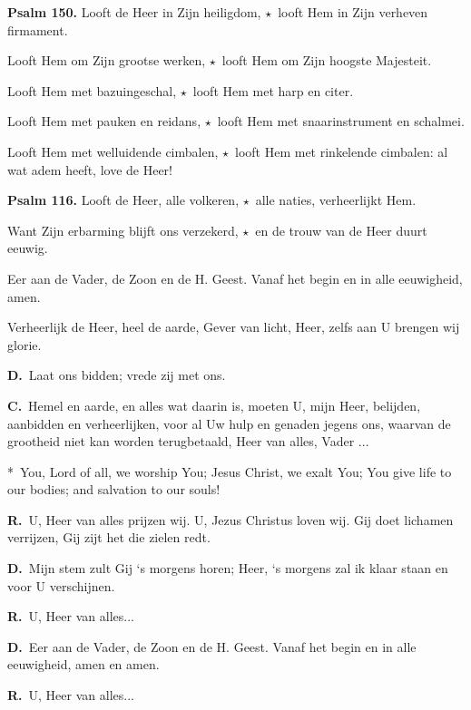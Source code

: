 \documentclass[12pt,twoside,a5paper]{article}
\newlength{\origparskip}
\newenvironment{halfparskip}{
  \setlength{\parskip}{0.5\origparskip}
}{
  \setlength{\parskip}{\origparskip}
}
\newcommand{\cc}{{\color{BrickRed} \textbf{C.}}}
\newcommand{\dd}{{\color{BrickRed} \textbf{D.}}}
\newcommand{\rr}{{\color{BrickRed} \textbf{R.}}}
\newcommand{\sep}{{\color{BrickRed} \textbf{$\star$}}}
\newcommand{\liturgicaloption}[1]{{\color{BrickRed}\textbf{#1}}}
\newcommand{\psalm}[1]{\liturgicaloption{Psalm #1.}}
\newenvironment{doublecols}{%
  \begin{paracol}{2}%
    \setlength{\columnsep}{1.5em}%
}{%
  \end{paracol}%
}
\newcommand{\englishl}{\switchcolumn[0]*\selectlanguage{english}}%
\newcommand{\dutchc}[1]{\switchcolumn[#1]\selectlanguage{dutch}}%
\begin{document}
\begin{halfparskip}
  \psalm{150} Looft de Heer in Zijn heiligdom, \sep\ looft Hem in Zijn verheven firmament.

  Looft Hem om Zijn grootse werken, \sep\ looft Hem om Zijn hoogste Majesteit.

  Looft Hem met bazuingeschal, \sep\ looft Hem met harp en citer.

  Looft Hem met pauken en reidans, \sep\ looft Hem met snaarinstrument en schalmei.

  Looft Hem met welluidende cimbalen, \sep\ looft Hem met rinkelende cimbalen: al wat adem heeft, love de Heer!
\end{halfparskip}

\begin{halfparskip}
  \psalm{116} Looft de Heer, alle volkeren, \sep\ alle naties, verheerlijkt Hem.

  Want Zijn erbarming blijft ons verzekerd, \sep\ en de trouw van de Heer duurt eeuwig.

  Eer aan de Vader, de Zoon en de H. Geest. Vanaf het begin en in alle eeuwigheid, amen.

  Verheerlijk de Heer, heel de aarde, Gever van licht, Heer, zelfs aan U brengen wij glorie.
\end{halfparskip}

\dd\ Laat ons bidden; vrede zij met ons.

\cc\ Hemel en aarde, en alles wat daarin is, moeten U, mijn Heer, belijden, aanbidden en verheerlijken, voor al Uw hulp en genaden jegens ons, waarvan de grootheid niet kan worden terugbetaald, Heer van alles, Vader ...

\begin{doublecols}
  \englishl \rr\ You, Lord of all, we worship You; Jesus Christ, we exalt You; You give life to our bodies; and salvation to our souls!

  \dutchc{1} \rr\ U, Heer van alles prijzen wij. U, Jezus Christus loven wij. Gij doet lichamen verrijzen, Gij zijt het die zielen redt.
\end{doublecols}

\dd\ Mijn stem zult Gij `s morgens horen; Heer, `s morgens zal ik klaar staan en voor U verschijnen.

\rr\ U, Heer van alles...

\dd\ Eer aan de Vader, de Zoon en de H. Geest. Vanaf het begin en in alle eeuwigheid, amen en amen.

\rr\ U, Heer van alles...
\end{document}
